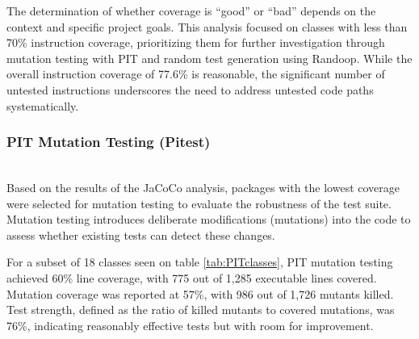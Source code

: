 \documentclass[sigconf]{acmart}
\begin{document}
The determination of whether coverage is “good” or “bad” depends on the context and specific project goals. This analysis focused on classes with less than 70\% instruction coverage, prioritizing them for further investigation through mutation testing with PIT and random test generation using Randoop. While the overall instruction coverage of 77.6\% is reasonable, the significant number of untested instructions underscores the need to address untested code paths systematically.

\subsubsection{PIT Mutation Testing (Pitest)}
\hfill\\
Based on the results of the JaCoCo analysis, packages with the lowest coverage were selected for mutation testing to evaluate the robustness of the test suite. Mutation testing introduces deliberate modifications (mutations) into the code to assess whether existing tests can detect these changes.

\begin{table}[h!]
\centering
{}
\caption{Classes with the Lowest Coverage Identified}
\label{tab:PITclasses}
\end{table}

For a subset of 18 classes seen on table \ref{tab:PITclasses}, PIT mutation testing achieved 60\% line coverage, with 775 out of 1,285 executable lines covered. Mutation coverage was reported at 57\%, with 986 out of 1,726 mutants killed. Test strength, defined as the ratio of killed mutants to covered mutations, was 76\%, indicating reasonably effective tests but with room for improvement.
\end{document}
